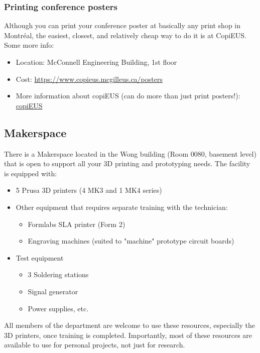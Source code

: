 \subsubsection{Printing conference posters}
Although you can print your conference poster at basically any print shop in Montr\'eal, the easiest, closest, and relatively cheap way to do it is at CopiEUS. Some more info:
\begin{itemize}
    \item Location: McConnell Engineering Building, 1st floor
    \item Cost: \href{https://www.copieus.mcgilleus.ca/posters}{https://www.copieus.mcgilleus.ca/posters}
    \item More information about copiEUS (can do more than just print posters!): \href{https://www.copieus.mcgilleus.ca/}{copiEUS}
\end{itemize}

\subsection{Makerspace} 
There is a Makerspace located in the Wong building (Room 0080, basement level) that is open to support all your 3D printing and prototyping needs. The facility is equipped with: 

\begin{itemize}
    \item 5 Prusa 3D printers (4 MK3 and 1 MK4 series)
    \item Other equipment that requires separate training with the technician:
    \begin{itemize}
        \item Formlabs SLA printer (Form 2) 
        \item Engraving machines (suited to "machine" prototype circuit boards)
    \end{itemize}
    \item Test equipment
    \begin{itemize}
        \item 3 Soldering stations 
        \item Signal generator
        \item Power supplies, etc.
    \end{itemize}
\end{itemize}
    
All members of the department are welcome to use these resources, especially the 3D printers, once training is completed. Importantly, most of these resources are available to use for personal projects, not just for research.

